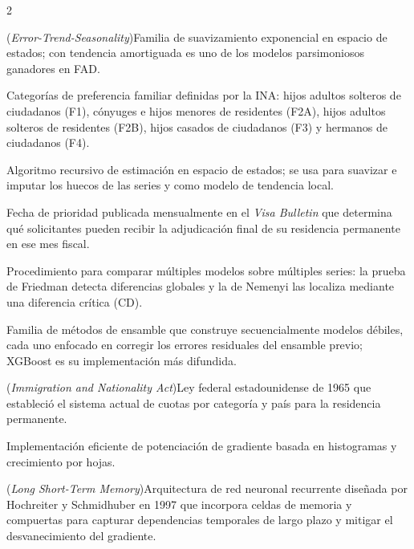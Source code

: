 \documentclass[12pt,letterpaper]{report}
\begin{document}
\begin{multicols}{2}
\begin{description}[leftmargin=0pt, labelindent=0pt, itemindent=0pt,
                    labelsep=0.4em, font=\bfseries\scriptsize,
                    itemsep=2pt, parsep=0pt, topsep=0pt]
    \item[ETS] (\textit{Error-Trend-Seasonality})\hspace{0.3em}Familia de suavizamiento exponencial en espacio de estados; con tendencia amortiguada es uno de los modelos parsimoniosos ganadores en FAD.

    \item[F1, F2A, F2B, F3, F4] Categorías de preferencia familiar definidas por la INA: hijos adultos solteros de ciudadanos (F1), cónyuges e hijos menores de residentes (F2A), hijos adultos solteros de residentes (F2B), hijos casados de ciudadanos (F3) y hermanos de ciudadanos (F4).

    \item[Filtro de Kalman] Algoritmo recursivo de estimación en espacio de estados; se usa para suavizar e imputar los huecos de las series y como modelo de tendencia local.

    \item[Final Action Dates] Fecha de prioridad publicada mensualmente en el \textit{Visa Bulletin} que determina qué solicitantes pueden recibir la adjudicación final de su residencia permanente en ese mes fiscal.

    \item[Friedman-Nemenyi (pruebas)] Procedimiento para comparar múltiples modelos sobre múltiples series: la prueba de Friedman detecta diferencias globales y la de Nemenyi las localiza mediante una diferencia crítica (CD).

    \item[Gradient Boosting] Familia de métodos de ensamble que construye secuencialmente modelos débiles, cada uno enfocado en corregir los errores residuales del ensamble previo; XGBoost es su implementación más difundida.

    \item[INA] (\textit{Immigration and Nationality Act})\hspace{0.3em}Ley federal estadounidense de 1965 que estableció el sistema actual de cuotas por categoría y país para la residencia permanente.

    \item[LightGBM] Implementación eficiente de potenciación de gradiente basada en histogramas y crecimiento por hojas.

    \item[LSTM] (\textit{Long Short-Term Memory})\hspace{0.3em}Arquitectura de red neuronal recurrente diseñada por Hochreiter y Schmidhuber en 1997 que incorpora celdas de memoria y compuertas para capturar dependencias temporales de largo plazo y mitigar el desvanecimiento del gradiente.


\end{description}
\end{multicols}
\end{document}
